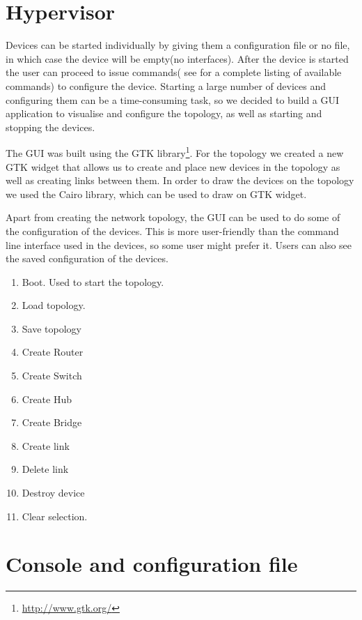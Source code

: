 \section{Hypervisor}
\label{sec:hypervisor2}

Devices can be started individually by giving them a configuration file or no file, in which case the device
will be empty(no interfaces). After the device is started the user can proceed to issue commands( see  
for a complete listing of available commands) to configure the device. Starting a large number of
devices and configuring them can be a time-consuming task, so we decided to build a GUI application to visualise and configure
the topology, as well as starting and stopping the devices.


The GUI was built using the GTK library\footnote{\url{http://www.gtk.org/}}. For the topology we created a new GTK widget
that allows us to create and place new devices in the topology as well as creating links between them. In order to draw
the devices on the topology we used the Cairo library, which can be used to draw on GTK widget.

Apart from creating the network topology, the GUI can be used to do some of the configuration of the devices. This is 
more user-friendly than the command line interface used in the devices, so some user might prefer it. Users can also see
the saved configuration of the devices.

\begin{enumerate}
  \item Boot. Used to start the topology. 
  \item Load topology. 
  \item Save topology
  \item Create Router
  \item Create Switch
  \item Create Hub
  \item Create Bridge
  \item Create link
  \item Delete link
  \item Destroy device
  \item Clear selection. 
\end{enumerate}

\section{Console and configuration file}
\label{sec:dev-conf}


